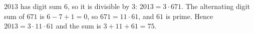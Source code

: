 $2013$ has digit sum $6$, so it is divisible by $3$: $2013=3\cdot671$. The alternating digit sum of $671$ is $6-7+1=0$, so $671=11\cdot61$, and $61$ is prime. Hence $2013=3\cdot11\cdot61$ and the sum is $3+11+61=\boxed{75}$.
